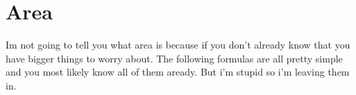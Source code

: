 \newpage

\section*{Area}
Im not going to tell you what area is because if you don't already know that you have bigger things to worry about. The following formulas are all pretty simple and you most likely know all of them aready. But i'm stupid so i'm leaving them in.
